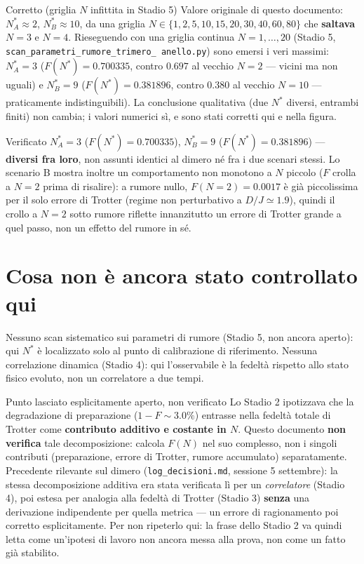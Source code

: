 \documentclass[11pt,a4paper]{article}
\begin{document}
\begin{okbox}{Corretto (griglia $N$ infittita in Stadio 5)}
Valore originale di questo documento: $N^*_A\approx2$,
$N^*_B\approx10$, da una griglia $N\in\{1,2,5,10,15,20,30,40,60,80\}$
che \textbf{saltava} $N=3$ e $N=4$. Rieseguendo con una griglia continua
$N=1,\ldots,20$ (Stadio 5, \texttt{scan\_parametri\_rumore\_trimero\_
anello.py}) sono emersi i veri massimi: $N^*_A=3$
($F(N^*)=0.700335$, contro $0.697$ al vecchio $N=2$ --- vicini ma non
uguali) e $N^*_B=9$ ($F(N^*)=0.381896$, contro $0.380$ al vecchio
$N=10$ --- praticamente indistinguibili). La conclusione qualitativa
(due $N^*$ diversi, entrambi finiti) non cambia; i valori numerici sì,
e sono stati corretti qui e nella figura.
\end{okbox}

\begin{okbox}{Verificato}
$N^*_A=3$ ($F(N^*)=0.700335$), $N^*_B=9$ ($F(N^*)=0.381896$) ---
\textbf{diversi fra loro}, non assunti identici al dimero né fra i due
scenari stessi. Lo scenario B mostra inoltre un comportamento non
monotono a $N$ piccolo ($F$ crolla a $N=2$ prima di risalire): a rumore
nullo, $F(N{=}2)=0.0017$ è già piccolissima per il solo errore di
Trotter (regime non perturbativo a $D/J\simeq1.9$), quindi il crollo a
$N=2$ sotto rumore riflette innanzitutto un errore di Trotter grande a
quel passo, non un effetto del rumore in sé.
\end{okbox}

\section{Cosa non è ancora stato controllato qui}

Nessuno scan sistematico sui parametri di rumore (Stadio 5, non ancora
aperto): qui $N^*$ è localizzato solo al punto di calibrazione di
riferimento. Nessuna correlazione dinamica (Stadio 4): qui l'osservabile
è la fedeltà rispetto allo stato fisico evoluto, non un correlatore a
due tempi.

\begin{okbox}{Punto lasciato esplicitamente aperto, non verificato}
Lo Stadio 2 ipotizzava che la degradazione di preparazione
($1-F\sim3.0\%$) entrasse nella fedeltà totale di Trotter come
\textbf{contributo additivo e costante in $N$}. Questo documento
\textbf{non verifica} tale decomposizione: calcola $F(N)$ nel suo
complesso, non i singoli contributi (preparazione, errore di Trotter,
rumore accumulato) separatamente. Precedente rilevante sul dimero
(\texttt{log\_decisioni.md}, sessione 5 settembre): la stessa
decomposizione additiva era stata verificata lì per un \emph{correlatore}
(Stadio 4), poi estesa per analogia alla fedeltà di Trotter (Stadio 3)
\textbf{senza} una derivazione indipendente per quella metrica --- un
errore di ragionamento poi corretto esplicitamente. Per non ripeterlo
qui: la frase dello Stadio 2 va quindi letta come un'ipotesi di lavoro
non ancora messa alla prova, non come un fatto già stabilito.
\end{okbox}
\end{document}
